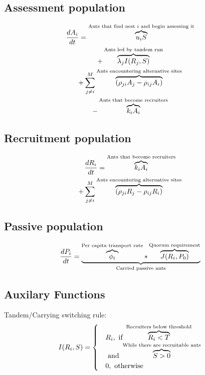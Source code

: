 \documentclass[letterpaper]{article}
\makeatletter
\def\mcolor#1#{\@mcolor{#1}}
\def\@mcolor#1#2#3{%
  \protect\leavevmode
  \begingroup
    \color#1{#2}#3%
  \endgroup
}
\newcommand{\annotate}[3]{
\mcolor{#1}{\overbrace{#3}^\text{#2}}
}
\makeatother
\begin{document}
  \subsection{Assessment population}
      \Large
      \begin{multline}
      \frac{dA_i}{dt} = \annotate{black}{Ants that find nest $i$ and begin assessing it}{u_iS} \\ 
      + \annotate{black}{Ants led by tandem run}{\lambda_jI(R_j, S)} \\
      + \sum_{j \neq i}^M \annotate{black}{Ants encountering alternative sites}{(\rho_{ji}A_j - \rho_{ij}A_i)} \\ 
      - \annotate{black}{Ants that become recruiters}{k_iA_i} \\
      \end{multline}
  \subsection{Recruitment population}
      \Large
      \begin{multline}
          \frac{dR_i}{dt} = \annotate{black}{Ants that become recruiters}{k_iA_i} \\
          + \sum_{j \neq i}^M \annotate{black}{Ants encountering alternative sites}{(\rho_{ji}R_j - \rho_{ij}R_i)}
      \end{multline}
  \subsection{Passive population}
      \Large
      \begin{equation}
          \frac{dP_i}{dt} = \underbrace{\annotate{black}{Per capita transport rate}{\phi_i} * \annotate{black}{Quorum requirement}{J(R_i, P_0)}}_\text{Carried passive ants}
      \end{equation}
  \subsection{Auxilary Functions}
      \Large
      Tandem/Carrying switching rule:
      \begin{equation}
          I(R_i, S) = 
          \begin{cases}
              & R_i,  \text{ if } \annotate{black}{Recruiters below threshold}{R_i < T} \\
              &       \text{     and } \annotate{black}{While there are recruitable ants}{S > 0}\\
              & 0, \text{ otherwise}
          \end{cases}
      \end{equation}
\end{document}
